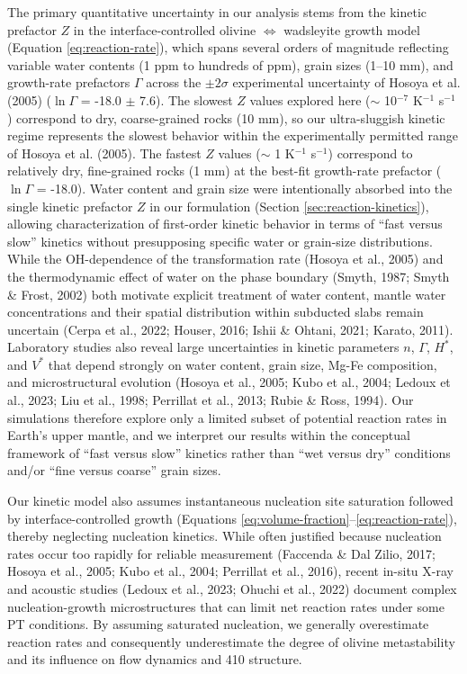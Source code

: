 \documentclass[draft,linenumbers]{agujournal2019}
\begin{document}
The primary quantitative uncertainty in our analysis stems from the
kinetic prefactor \(Z\) in the interface-controlled olivine
\(\Leftrightarrow\) wadsleyite growth model (Equation
\ref{eq:reaction-rate}), which spans several orders of magnitude
reflecting variable water contents (1 ppm to hundreds of ppm), grain
sizes (1--10 mm), and growth-rate prefactors \(\Gamma\) across the
\(\pm2\sigma\) experimental uncertainty of Hosoya et al. (2005)
(\(\ln\Gamma\) = -18.0 \(\pm\) 7.6). The slowest \(Z\) values explored
here (\(\sim\) 10\(^{-7}\) K\(^{-1}\) s\(^{-1}\)) correspond to dry,
coarse-grained rocks (10 mm), so our ultra-sluggish kinetic regime
represents the slowest behavior within the experimentally permitted
range of Hosoya et al. (2005). The fastest \(Z\) values (\(\sim\) 1
K\(^{-1}\) s\(^{-1}\)) correspond to relatively dry, fine-grained rocks
(1 mm) at the best-fit growth-rate prefactor (\(\ln\Gamma\) = -18.0).
Water content and grain size were intentionally absorbed into the single
kinetic prefactor \(Z\) in our formulation (Section
\ref{sec:reaction-kinetics}), allowing characterization of first-order
kinetic behavior in terms of ``fast versus slow'' kinetics without
presupposing specific water or grain-size distributions. While the
OH-dependence of the transformation rate (Hosoya et al., 2005) and the
thermodynamic effect of water on the phase boundary (Smyth, 1987; Smyth
\& Frost, 2002) both motivate explicit treatment of water content,
mantle water concentrations and their spatial distribution within
subducted slabs remain uncertain (Cerpa et al., 2022; Houser, 2016;
Ishii \& Ohtani, 2021; Karato, 2011). Laboratory studies also reveal
large uncertainties in kinetic parameters \(n\), \(\Gamma\),
\(H^{\ast}\), and \(V^{\ast}\) that depend strongly on water content,
grain size, Mg-Fe composition, and microstructural evolution (Hosoya et
al., 2005; Kubo et al., 2004; {Ledoux et al.}, 2023; Liu et al., 1998;
Perrillat et al., 2013; Rubie \& Ross, 1994). Our simulations therefore
explore only a limited subset of potential reaction rates in Earth's
upper mantle, and we interpret our results within the conceptual
framework of ``fast versus slow'' kinetics rather than ``wet versus
dry'' conditions and/or ``fine versus coarse'' grain sizes.

Our kinetic model also assumes instantaneous nucleation site saturation
followed by interface-controlled growth (Equations
\ref{eq:volume-fraction}--\ref{eq:reaction-rate}), thereby neglecting
nucleation kinetics. While often justified because nucleation rates
occur too rapidly for reliable measurement (Faccenda \& Dal Zilio, 2017;
Hosoya et al., 2005; Kubo et al., 2004; Perrillat et al., 2016), recent
in-situ X-ray and acoustic studies ({Ledoux et al.}, 2023; Ohuchi et
al., 2022) document complex nucleation-growth microstructures that can
limit net reaction rates under some PT conditions. By assuming saturated
nucleation, we generally overestimate reaction rates and consequently
underestimate the degree of olivine metastability and its influence on
flow dynamics and 410 structure.
\end{document}
